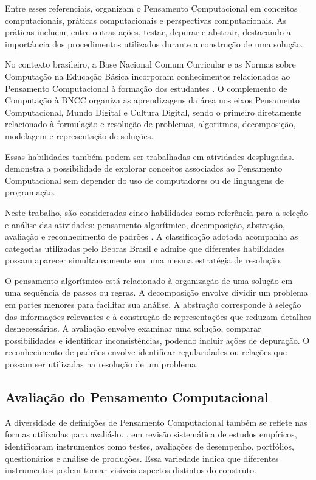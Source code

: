 Entre esses referenciais,  organizam o Pensamento Computacional em conceitos computacionais, práticas computacionais e perspectivas computacionais. As práticas incluem, entre outras ações, testar, depurar e abstrair, destacando a importância dos procedimentos utilizados durante a construção de uma solução.

No contexto brasileiro, a Base Nacional Comum Curricular e as Normas sobre Computação na Educação Básica incorporam conhecimentos relacionados ao Pensamento Computacional à formação dos estudantes \cite{brasil2018,cne2022}. O complemento de Computação à BNCC organiza as aprendizagens da área nos eixos Pensamento Computacional, Mundo Digital e Cultura Digital, sendo o primeiro diretamente relacionado à formulação e resolução de problemas, algoritmos, decomposição, modelagem e representação de soluções.

Essas habilidades também podem ser trabalhadas em atividades desplugadas.  demonstra a possibilidade de explorar conceitos associados ao Pensamento Computacional sem depender do uso de computadores ou de linguagens de programação.

Neste trabalho, são consideradas cinco habilidades como referência para a seleção e análise das atividades: pensamento algorítmico, decomposição, abstração, avaliação e reconhecimento de padrões \cite{brackmann2017,bebras2026}. A classificação adotada acompanha as categorias utilizadas pelo Bebras Brasil e admite que diferentes habilidades possam aparecer simultaneamente em uma mesma estratégia de resolução.

O pensamento algorítmico está relacionado à organização de uma solução em uma sequência de passos ou regras. A decomposição envolve dividir um problema em partes menores para facilitar sua análise. A abstração corresponde à seleção das informações relevantes e à construção de representações que reduzam detalhes desnecessários. A avaliação envolve examinar uma solução, comparar possibilidades e identificar inconsistências, podendo incluir ações de depuração. O reconhecimento de padrões envolve identificar regularidades ou relações que possam ser utilizadas na resolução de um problema.

\subsection{Avaliação do Pensamento Computacional}

A diversidade de definições de Pensamento Computacional também se reflete nas formas utilizadas para avaliá-lo. , em revisão sistemática de estudos empíricos, identificaram instrumentos como testes, avaliações de desempenho, portfólios, questionários e análise de produções. Essa variedade indica que diferentes instrumentos podem tornar visíveis aspectos distintos do construto.

